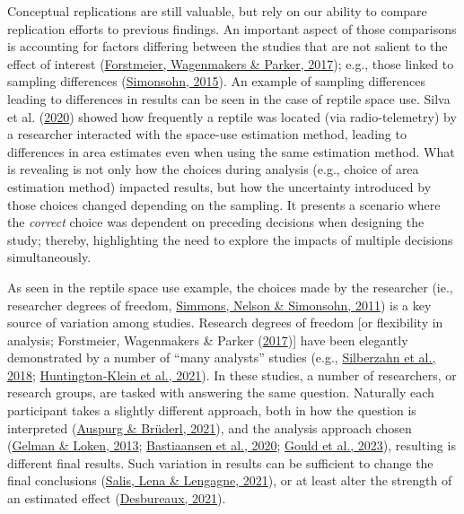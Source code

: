 \documentclass[10pt,a4paper]{article}
\begin{document}
Conceptual replications are still valuable, but rely on our ability to compare replication efforts to previous findings.
An important aspect of those comparisons is accounting for factors differing between the studies that are not salient to the effect of interest (\protect\hyperlink{ref-forstmeier_detecting_2017}{Forstmeier, Wagenmakers \& Parker, 2017}); e.g., those linked to sampling differences (\protect\hyperlink{ref-simonsohn_small_2015}{Simonsohn, 2015}).
An example of sampling differences leading to differences in results can be seen in the case of reptile space use.
Silva et al. (\protect\hyperlink{ref-silva_reptiles_2020}{2020}) showed how frequently a reptile was located (via radio-telemetry) by a researcher interacted with the space-use estimation method, leading to differences in area estimates even when using the same estimation method.
What is revealing is not only how the choices during analysis (e.g., choice of area estimation method) impacted results, but how the uncertainty introduced by those choices changed depending on the sampling.
It presents a scenario where the \emph{correct} choice was dependent on preceding decisions when designing the study; thereby, highlighting the need to explore the impacts of multiple decisions simultaneously.

As seen in the reptile space use example, the choices made by the researcher (ie., researcher degrees of freedom, \protect\hyperlink{ref-simmons_false-positive_2011}{Simmons, Nelson \& Simonsohn, 2011}) is a key source of variation among studies.
Research degrees of freedom {[}or flexibility in analysis; Forstmeier, Wagenmakers \& Parker (\protect\hyperlink{ref-forstmeier_detecting_2017}{2017}){]} have been elegantly demonstrated by a number of ``many analysts'' studies (e.g., \protect\hyperlink{ref-silberzahn_many_2018}{Silberzahn et al., 2018}; \protect\hyperlink{ref-huntingtonklein_influence_2021}{Huntington‐Klein et al., 2021}).
In these studies, a number of researchers, or research groups, are tasked with answering the same question.
Naturally each participant takes a slightly different approach, both in how the question is interpreted (\protect\hyperlink{ref-auspurg_has_2021}{Auspurg \& Brüderl, 2021}), and the analysis approach chosen (\protect\hyperlink{ref-gelman_garden_2013}{Gelman \& Loken, 2013}; \protect\hyperlink{ref-bastiaansen_time_2020}{Bastiaansen et al., 2020}; \protect\hyperlink{ref-gould_same_2023}{Gould et al., 2023}), resulting is different final results.
Such variation in results can be sufficient to change the final conclusions (\protect\hyperlink{ref-salis_how_2021}{Salis, Lena \& Lengagne, 2021}), or at least alter the strength of an estimated effect (\protect\hyperlink{ref-desbureaux_subjective_2021}{Desbureaux, 2021}).
\end{document}
